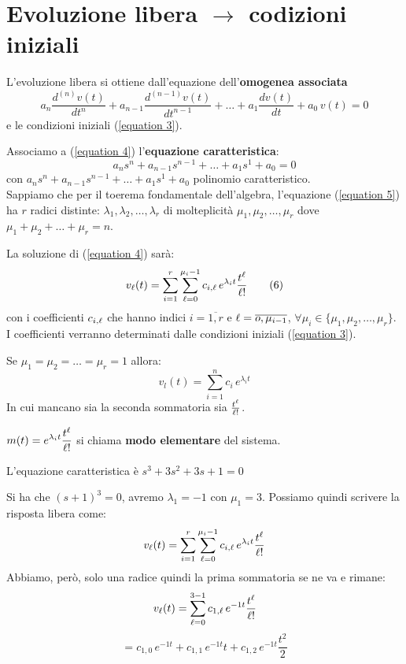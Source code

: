 \section{Evoluzione libera $ \rightarrow $ codizioni iniziali}
	L'evoluzione libera si ottiene dall'equazione dell'\textbf{omogenea associata}
	\begin{equation}
		a_n \frac{d^{(n)} v(t)}{dt^n} 
			+ a_{n-1} \frac{d^{(n-1)} v(t)}{dt^{n-1}} 
			+ \dots 
			+ a_1 \frac{dv(t)}{dt} 
			+ a_0\,v(t)
		= 0
		\tag{4}\label{equation 4}
	\end{equation}
	e le condizioni iniziali (\ref{equation 3}).
	
	Associamo a (\ref{equation 4}) l'\textbf{equazione caratteristica}:
	\begin{equation}
		a_n s^n 
		+ a_{n-1} s^{n-1}
		+ \dots
		+ a_1 s^1
		+ a_0 = 0
		\tag{5}\label{equation 5}
	\end{equation}
	con $a_n s^n + a_{n-1} s^{n-1} + \dots + a_1 s^1 + a_0 $ polinomio caratteristico.\\

	Sappiamo che per il toerema fondamentale dell'algebra, l'equazione (\ref{equation 5}) ha $r$ radici  distinte: $\lambda_1,\lambda_2, \dots, \lambda_r$ di molteplicità $\mu_1, \mu_2, \dots,\mu_r$ dove  $\mu_1 +\mu_2 + \dots + \mu_r = n$.
	
	La soluzione di (\ref{equation 4}) sarà:
	\begin{equation}
		v_\ell(t)=  \sum_{i=1}^{r}\sum_{\ell=0}^{\mu_i-1}c_{i,\ell} \,e^{\lambda_it}\frac{t^\ell}{\ell!}
		\tag{6}\label{equation 6}
	\end{equation}
	con i coefficienti $c_{i,\ell} $ che hanno indici $ i=\overline{1,r} $ e $ \ell=\overline{o,\mu_{i-1}}$, $ \forall\mu_i \in \{\mu_1,\mu_2,\dots,\mu_r\} $. I coefficienti verranno determinati dalle condizioni iniziali (\ref{equation 3}).
		
	\begin{osservazione}
		Se $\mu_1 = \mu_2 = \dots = \mu_r = 1$ allora:
		\begin{equation*}
			v_l(t)=  \sum_{i=1}^{n}c_{i} \,e^{\lambda_it}
		\end{equation*}
		In cui mancano sia la seconda sommatoria sia $ \frac{t^\ell}{\ell!}$.
	\end{osservazione}
	
	\begin{definizione}
		$\displaystyle m(t) = e^{\lambda_i t} \frac{t^\ell}{\ell!} $ si chiama \textbf{modo elementare} del sistema.
	\end{definizione}
	\begin{nexample}
	L'equazione caratteristica è $ s^3 + 3 s^2 + 3s +1=0$
	
	Si ha che $ (s+1)^3=0$, avremo $ \lambda_{1} = -1$ con $ \mu_1=3 $. 
	Possiamo quindi scrivere la risposta libera come:
	\[ v_\ell(t) =\sum_{i=1}^{r}\sum_{\ell=0}^{\mu_i-1}c_{i,\ell} \,e^{\lambda_it}\frac{t^\ell}{\ell!} \]
	Abbiamo, però, solo una radice quindi la prima sommatoria se ne va e rimane:
	 \[ v_\ell(t) =\sum_{\ell=0}^{3-1}c_{1,\ell} \,e^{-1 t}\frac{t^\ell}{\ell!}  \]
	 \[ = c_{1,0} \, e^{-1t} + c_{1,1}\, e^{-1t} t + c_{1,2}\, e^{-1t} \frac{t^2}{2} \]
	\end{nexample}
	
